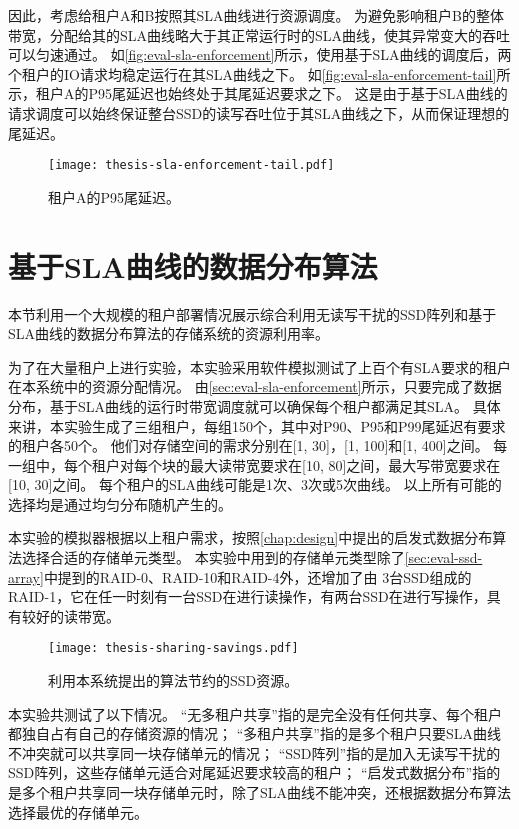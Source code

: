 因此，考虑给租户A和B按照其SLA曲线进行资源调度。
为避免影响租户B的整体带宽，分配给其的SLA曲线略大于其正常运行时的SLA曲线，使其异常变大的吞吐可以匀速通过。
如\autoref{fig:eval-sla-enforcement}所示，使用基于SLA曲线的调度后，两个租户的IO请求均稳定运行在其SLA曲线之下。
如\autoref{fig:eval-sla-enforcement-tail}所示，租户A的P95尾延迟也始终处于其尾延迟要求之下。
这是由于基于SLA曲线的请求调度可以始终保证整台SSD的读写吞吐位于其SLA曲线之下，从而保证理想的尾延迟。

\begin{figure}[h]
  \centering
  \texttt{[image: thesis-sla-enforcement-tail.pdf]}
  \caption{
        租户A的P95尾延迟。
      }
  \label{fig:eval-sla-enforcement-tail}
\end{figure}

\section{基于SLA曲线的数据分布算法}
\label{sec:eval-sla-placement}

本节利用一个大规模的租户部署情况展示综合利用无读写干扰的SSD阵列和基于SLA曲线的数据分布算法的存储系统的资源利用率。

为了在大量租户上进行实验，本实验采用软件模拟测试了上百个有SLA要求的租户在本系统中的资源分配情况。
由\autoref{sec:eval-sla-enforcement}所示，只要完成了数据分布，基于SLA曲线的运行时带宽调度就可以确保每个租户都满足其SLA。
具体来讲，本实验生成了三组租户，每组150个，其中对P90、P95和P99尾延迟有要求的租户各50个。
他们对存储空间的需求分别在[1, 30]，[1, 100]和[1, 400]之间。
每一组中，每个租户对每个块的最大读带宽要求在[10, 80]之间，最大写带宽要求在[10, 30]之间。
每个租户的SLA曲线可能是1次、3次或5次曲线。
以上所有可能的选择均是通过均匀分布随机产生的。

本实验的模拟器根据以上租户需求，按照\autoref{chap:design}中提出的启发式数据分布算法选择合适的存储单元类型。
本实验中用到的存储单元类型除了\autoref{sec:eval-ssd-array}中提到的RAID-0、RAID-10和RAID-4外，还增加了由
3台SSD组成的RAID-1，它在任一时刻有一台SSD在进行读操作，有两台SSD在进行写操作，具有较好的读带宽。

\begin{figure}[h]
  \centering
  \texttt{[image: thesis-sharing-savings.pdf]}
  \caption{
        利用本系统提出的算法节约的SSD资源。
      }
  \label{fig:eval-sharing-savings}
\end{figure}

本实验共测试了以下情况。
“无多租户共享”指的是完全没有任何共享、每个租户都独自占有自己的存储资源的情况；
“多租户共享”指的是多个租户只要SLA曲线不冲突就可以共享同一块存储单元的情况；
“SSD阵列”指的是加入无读写干扰的SSD阵列，这些存储单元适合对尾延迟要求较高的租户；
“启发式数据分布”指的是多个租户共享同一块存储单元时，除了SLA曲线不能冲突，还根据数据分布算法选择最优的存储单元。

